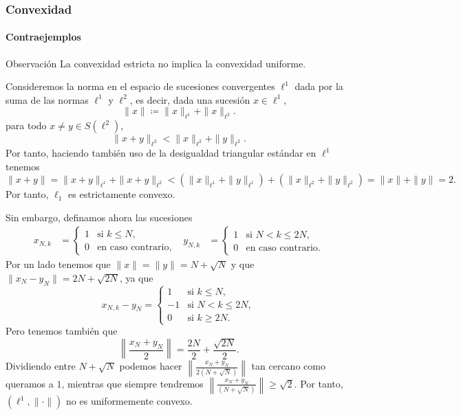 \documentclass[aspectratio=169]{beamer}
\begin{document}
\begin{frame}
  \frametitle{Convexidad}
  \framesubtitle{Contraejemplos}
  \begin{block}{Observación}
    La convexidad estricta no implica la convexidad uniforme.
  \end{block}
  Consideremos la norma en el espacio de sucesiones convergentes $ \ell^1 $ dada por la suma de las normas $ \ell^1 $ y $ \ell^2 $, es decir, dada una sucesión $ x \in \ell^1 $,
    \begin{equation}
        \| x \| \coloneq \| x \|_{\ell^1} + \| x \|_{\ell^2}.
    \end{equation}
  para todo $ x \neq y \in S(\ell^2) $,
    \begin{equation}
        \|x+y\|_{\ell^2} < \|x\|_{\ell^2} + \|y\|_{\ell^2}.
    \end{equation}
    Por tanto, haciendo también uso de la desigualdad triangular estándar en $ \ell^1 $ tenemos
    \begin{equation}
        \|x+y\| = \|x+y\|_{\ell^1} + \|x+y\|_{\ell^2} < \left( \|x\|_{\ell^1} + \|y\|_{\ell^1} \right) + \left( \|x\|_{\ell^2} + \|y\|_{\ell^2} \right) = \|x\| + \|y\| = 2.
    \end{equation}
    Por tanto, $ \ell_1 $ es estrictamente convexo. 
\end{frame}

\begin{frame}
  Sin embargo, definamos ahora las sucesiones
    \begin{align}
        x_{N, k} &=
        \begin{cases}
            1 & \text{si } k \leq N, \\
            0 & \text{en caso contrario},
        \end{cases}
        &
        y_{N, k} &=
        \begin{cases}
            1 & \text{si } N < k \leq 2N, \\
            0 & \text{en caso contrario}.
        \end{cases}
    \end{align}
    Por un lado tenemos que $ \|x\| = \|y\| = N + \sqrt{N} $ y que $ \|x_N - y_N\| = 2N + \sqrt{2N} $, ya que
    \begin{equation}
        x_{N, k} - y_N =
        \begin{cases}
            1 & \text{si } k \leq N, \\
            -1 & \text{si } N < k \leq 2N, \\
            0 & \text{si } k \geq 2N.
        \end{cases}
    \end{equation}
    Pero tenemos también que
    \begin{equation}
        \left\| \frac{x_N+y_N}{2} \right\| = \frac{2N}{2} + \frac{\sqrt{2N}}{2}.
    \end{equation}
    Dividiendo entre $ N + \sqrt{N} $ podemos hacer $ \left\| \frac{x_N+y_N}{2 (N + \sqrt{N})} \right\| $ tan cercano como queramos a $ 1 $, mientras que siempre tendremos $ \left\| \frac{x_N+y_N}{(N + \sqrt{N})} \right\| \geq \sqrt{2}$. Por tanto, $ (\ell^1, \| \cdot \|) $ no es uniformemente convexo.
\end{frame}
\end{document}
